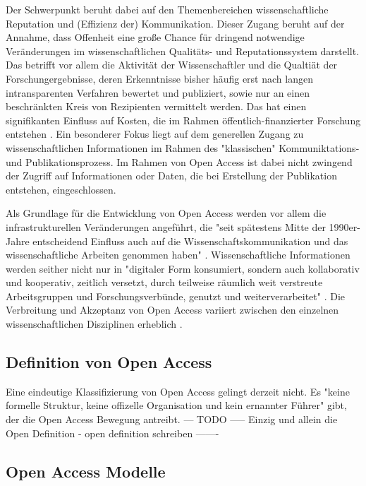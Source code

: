 Der Schwerpunkt beruht dabei auf den Themenbereichen wissenschaftliche Reputation und (Effizienz der) Kommunikation. Dieser Zugang beruht auf der Annahme, dass Offenheit eine große Chance für dringend notwendige Veränderungen im wissenschaftlichen Qualitäts- und Reputationssystem darstellt. Das betrifft vor allem die Aktivität der Wissenschaftler und die Qualtiät der Forschungergebnisse, deren Erkenntnisse bisher häufig erst nach langen intransparenten Verfahren bewertet und publiziert, sowie nur an einen beschränkten Kreis von Rezipienten vermittelt werden. Das hat einen signifikanten Einfluss auf Kosten, die im Rahmen öffentlich-finanzierter Forschung entstehen \cite{suchen}. Ein besonderer Fokus liegt auf dem generellen Zugang zu wissenschaftlichen Informationen im Rahmen des "klassischen" Kommuniktations- und Publikationsprozess. Im Rahmen von Open Access ist dabei nicht zwingend der Zugriff auf Informationen oder Daten, die bei Erstellung der Publikation entstehen, eingeschlossen. 

Als Grundlage für die Entwicklung von Open Access werden vor allem die infrastrukturellen Veränderungen angeführt, die "seit spätestens Mitte der 1990er-Jahre entscheidend Einfluss auch auf die Wissenschaftskommunikation und das wissenschaftliche Arbeiten genommen haben" \cite{schulze_2013_open}. Wissenschaftliche Informationen werden seither nicht nur in "digitaler Form konsumiert, sondern auch kollaborativ und kooperativ, zeitlich versetzt, durch teilweise räumlich weit verstreute Arbeitsgruppen und Forschungsverbünde, genutzt und weiterverarbeitet" \cite{schulze_2013_open}. Die Verbreitung und Akzeptanz von Open Access variiert zwischen den einzelnen wissenschaftlichen Disziplinen erheblich \cite{cite:21a} .

\subsection{Definition von Open Access}

Eine eindeutige Klassifizierung von Open Access gelingt derzeit nicht. Es "keine formelle Struktur, keine offizelle Organisation und kein ernannter Führer" gibt, der die Open Access Bewegung antreibt\cite{poynder_2011_suber}. --- TODO ----- Einzig und allein die Open Definition - open definition schreiben -------

\subsection{Open Access Modelle}

